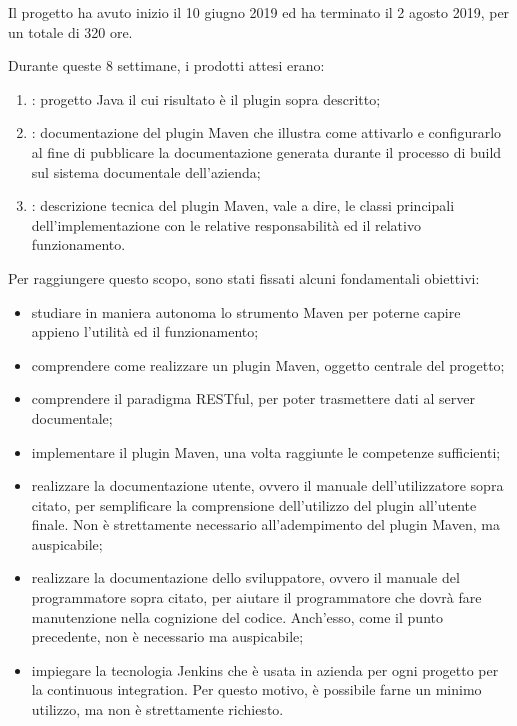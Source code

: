     
    Il progetto ha avuto inizio il 10 giugno 2019 ed ha terminato il 2 agosto 2019, per un totale di 320 ore.

    Durante queste 8 settimane, i prodotti attesi erano:
    \begin{enumerate}
        \item {}: progetto Java il cui risultato è il plugin sopra descritto;
        \item {}: documentazione del plugin Maven che illustra come attivarlo e configurarlo al fine di pubblicare la documentazione generata durante il processo di build sul sistema documentale dell’azienda;
        \item {}: descrizione tecnica del plugin Maven, vale a dire, le classi principali dell’implementazione con le relative responsabilità ed il relativo funzionamento.
    \end{enumerate}

    Per raggiungere questo scopo, sono stati fissati alcuni fondamentali obiettivi:
    \begin{itemize}
        \item studiare in maniera autonoma lo strumento Maven per poterne capire appieno l'utilità ed il funzionamento;
        \item comprendere come realizzare un plugin Maven, oggetto centrale del progetto;
        \item comprendere il paradigma RESTful, per poter trasmettere dati al server documentale;
        \item implementare il plugin Maven, una volta raggiunte le competenze sufficienti;
        \item realizzare la documentazione utente, ovvero il manuale dell'utilizzatore sopra citato, per semplificare la comprensione dell'utilizzo del plugin all'utente finale. Non è strettamente necessario all'adempimento del plugin Maven, ma auspicabile;
        \item realizzare la documentazione dello sviluppatore, ovvero il manuale del programmatore sopra citato, per aiutare il programmatore che dovrà fare manutenzione nella cognizione del codice. Anch'esso, come il punto precedente, non è necessario ma auspicabile;
        \item impiegare la tecnologia Jenkins che è usata in azienda per ogni progetto per la continuous integration. Per questo motivo, è possibile farne un minimo utilizzo, ma non è strettamente richiesto.
    \end{itemize}
    
